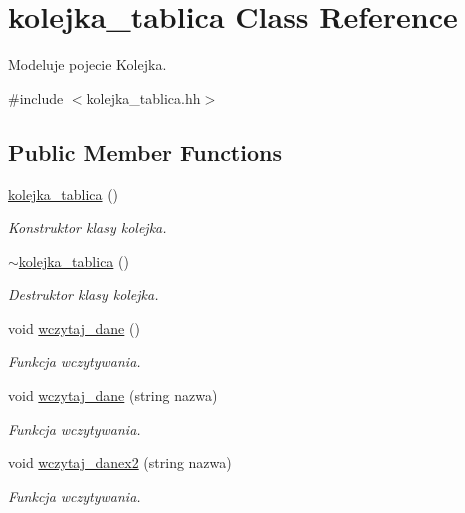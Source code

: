 \hypertarget{classkolejka__tablica}{\section{kolejka\-\_\-tablica Class Reference}
\label{classkolejka__tablica}
}


Modeluje pojecie Kolejka.  




{\ttfamily \#include $<$kolejka\-\_\-tablica.\-hh$>$}

\subsection*{Public Member Functions}
\begin{DoxyCompactItemize}
\item 
\hyperlink{classkolejka__tablica_a565d77cf3095a0cb77cfccf27e9260a9}{kolejka\-\_\-tablica} ()
\begin{DoxyCompactList}\small\item\em Konstruktor klasy kolejka. \end{DoxyCompactList}\item 
\hyperlink{classkolejka__tablica_a5acfcbf51ae46b443f12d42434979071}{$\sim$kolejka\-\_\-tablica} ()
\begin{DoxyCompactList}\small\item\em Destruktor klasy kolejka. \end{DoxyCompactList}\item 
void \hyperlink{classkolejka__tablica_af0bad5bef2d63767aff69de565026fd2}{wczytaj\-\_\-dane} ()
\begin{DoxyCompactList}\small\item\em Funkcja wczytywania. \end{DoxyCompactList}\item 
void \hyperlink{classkolejka__tablica_a228697894cc79cea2e5555d624989b1d}{wczytaj\-\_\-dane} (string nazwa)
\begin{DoxyCompactList}\small\item\em Funkcja wczytywania. \end{DoxyCompactList}\item 
void \hyperlink{classkolejka__tablica_a997d0fa8aa2ff8eb838998a82353d828}{wczytaj\-\_\-danex2} (string nazwa)
\begin{DoxyCompactList}\small\item\em Funkcja wczytywania. \end{DoxyCompactList}\item 

\end{DoxyCompactItemize}
